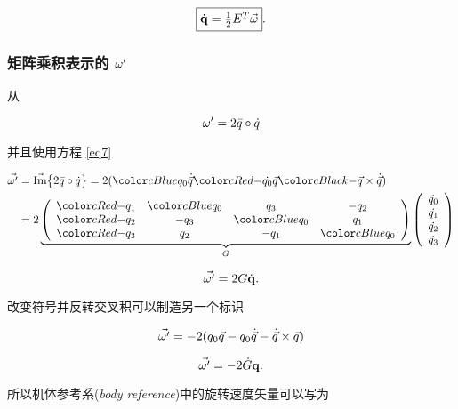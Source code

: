 \begin{equation}
\fbox{$ \dot{\mathbf{q}} = \frac{1}{2} E^T\vec{\omega} $} .
\label{eq_dotq_w}
\end{equation}


\subsubsection{矩阵乘积表示的 $\omega'$}
\label{secMat2}

从

\begin{equation*}
\omega' = 2 \bar{q} \circ \dot{q} 
\end{equation*}

并且使用方程 \eqref{eq7}

\begin{align*}
\vec{\w'} &= \IM\big\{{2 \bar{q} \o \dot{q}} \big\} = 2(\Blue{q_0\dot{\vec{q}}} \Red{ - \dot{q_0}\vec{q}} \Black{- \vec{q} \c \dot{\vec{q}})} \\
         &= 2 \underbrace{\left( \begin{array}{cccc}
\Red{-q_1} &  \Blue{q_0} & q_3 & -q_2 \\
\Red{-q_2} & -q_3 & \Blue{q_0}  & q_1 \\
\Red{-q_3} & q_2 & -q_1  & \Blue{q_0} \\
\end{array} \right)}_{G} \left( \begin{array}{c}
\dot{q_0} \\
\dot{q_1} \\
\dot{q_2} \\
\dot{q_3} \\
\end{array} \right)
\end{align*}

\begin{equation*}
\vec{\omega'} = 2G\dot{\mathbf{q}} .
\end{equation*}

改变符号并反转交叉积可以制造另一个标识

\begin{equation*}
\vec{\omega'} = -2(\dot{q_0}\vec{q} - q_0\dot{\vec{q}} - \dot{\vec{q}} \times \vec{q}) 
\end{equation*}

\begin{equation*}
\vec{\omega'} = -2\dot{G}\mathbf{q} .
\end{equation*}

所以机体参考系(\emph{body reference})中的旋转速度矢量可以写为

